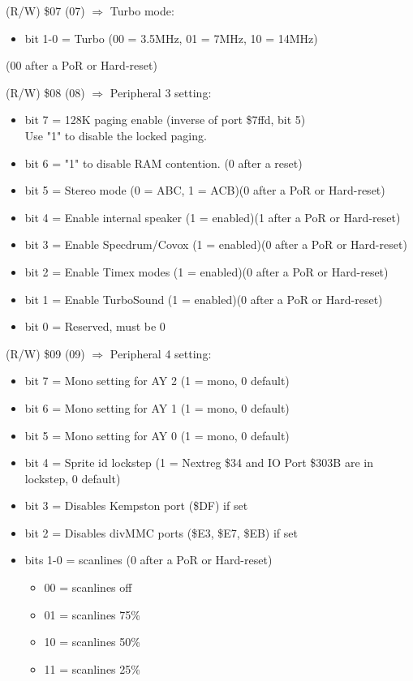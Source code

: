 (R/W) \$07 (07) $\Rightarrow$ Turbo mode:
\begin{itemize}
\item[] bit 1-0 = Turbo (00 = 3.5MHz, 01 = 7MHz, 10 = 14MHz)
\end{itemize}
(00 after a PoR or Hard-reset)

(R/W) \$08 (08) $\Rightarrow$ Peripheral 3 setting:
\begin{itemize}
\item[] bit 7 = 128K paging enable (inverse of port \$7ffd, bit 5)\\
  Use "1" to disable the locked paging.
\item[] bit 6 = "1" to disable RAM contention. (0 after a reset)
\item[] bit 5 = Stereo mode (0 = ABC, 1 = ACB)(0 after a PoR or Hard-reset)
\item[] bit 4 = Enable internal speaker (1 = enabled)(1 after a PoR or
  Hard-reset)
\item[] bit 3 = Enable Specdrum/Covox (1 = enabled)(0 after a PoR or Hard-reset)
\item[] bit 2 = Enable Timex modes (1 = enabled)(0 after a PoR or Hard-reset)
\item[] bit 1 = Enable TurboSound (1 = enabled)(0 after a PoR or Hard-reset)
\item[] bit 0 = Reserved, must be 0
\end{itemize}

(R/W) \$09 (09) $\Rightarrow$ Peripheral 4 setting:
\begin{itemize}
\item[] bit 7 = Mono setting for AY 2 (1 = mono, 0 default)
\item[] bit 6 = Mono setting for AY 1 (1 = mono, 0 default)
\item[] bit 5 = Mono setting for AY 0 (1 = mono, 0 default)
\item[] bit 4 = Sprite id lockstep (1 = Nextreg \$34 and IO Port \$303B are in lockstep, 0 default)
\item[] bit 3 = Disables Kempston port (\$DF) if set
\item[] bit 2 = Disables divMMC ports (\$E3, \$E7, \$EB) if set
\item[] bits 1-0 = scanlines (0 after a PoR or Hard-reset)
  \begin{itemize}
  \item[] 00 = scanlines off
  \item[] 01 = scanlines 75\%
  \item[] 10 = scanlines 50\%
  \item[] 11 = scanlines 25\%
  \end{itemize}
\end{itemize}

